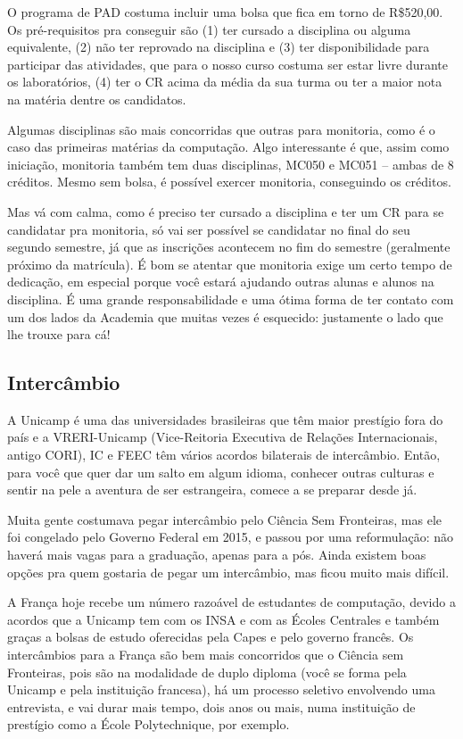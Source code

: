 O programa de PAD costuma incluir uma bolsa que fica em torno de R\$520,00.
Os pré-requisitos pra conseguir são (1) ter cursado a disciplina ou alguma
equivalente, (2) não ter reprovado na disciplina e (3) ter disponibilidade para
participar das atividades, que para o nosso curso costuma ser estar livre
durante os laboratórios, (4) ter o CR acima da média da sua turma ou ter a
maior nota na matéria dentre os candidatos.

Algumas disciplinas são mais concorridas que outras para monitoria, como é o
caso das primeiras matérias da computação. Algo interessante é que, assim como
iniciação, monitoria também tem duas disciplinas, MC050 e MC051 -- ambas de 8
créditos. Mesmo sem bolsa, é possível exercer monitoria, conseguindo os
créditos.

Mas vá com calma, como é preciso ter cursado a disciplina e ter um CR para se
candidatar pra monitoria, só vai ser possível se candidatar no final do seu
segundo semestre, já que as inscrições acontecem no fim do semestre (geralmente
próximo da matrícula). É bom se atentar que monitoria exige um certo tempo de
dedicação, em especial porque você estará ajudando outras alunas e alunos na
disciplina. É uma grande responsabilidade e uma ótima forma de ter contato com
um dos lados da Academia que muitas vezes é esquecido: justamente o lado que
lhe trouxe para cá!

\subsection{Intercâmbio}

A Unicamp é uma das universidades brasileiras que têm maior prestígio fora do
país e a VRERI-Unicamp (Vice-Reitoria Executiva de Relações Internacionais,
antigo CORI), IC e FEEC têm vários acordos bilaterais de intercâmbio. Então,
para você que quer dar um salto em algum idioma, conhecer outras culturas e
sentir na pele a aventura de ser estrangeira, comece a se preparar desde já.

Muita gente costumava pegar intercâmbio pelo Ciência Sem Fronteiras, mas ele
foi congelado pelo Governo Federal em 2015, e passou por uma reformulação: não
haverá mais vagas para a graduação, apenas para a pós. Ainda existem boas
opções pra quem gostaria de pegar um intercâmbio, mas ficou muito mais difícil.

A França hoje recebe um número razoável de estudantes de computação, devido a
acordos que a Unicamp tem com os INSA e com as Écoles Centrales e também graças
a bolsas de estudo oferecidas pela Capes e pelo governo francês. Os
intercâmbios para a França são bem mais concorridos que o Ciência sem
Fronteiras, pois são na modalidade de duplo diploma (você se forma pela Unicamp
e pela instituição francesa), há um processo seletivo envolvendo uma
entrevista, e vai durar mais tempo, dois anos ou mais, numa instituição de
prestígio como a École Polytechnique, por exemplo.

